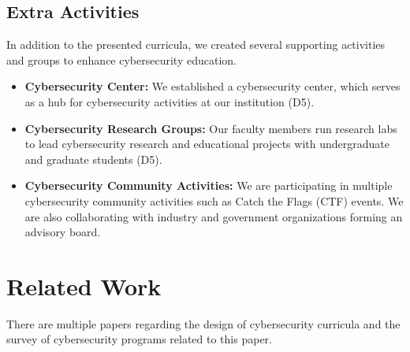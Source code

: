 \documentclass{article}
\begin{document}
\subsection{Extra Activities}

In addition to the presented curricula, we created several supporting activities and groups to enhance cybersecurity education.

\begin{itemize}

\item \textbf{Cybersecurity Center:} We established a cybersecurity center, which serves as a hub for cybersecurity activities at our institution (D5).

\item \textbf{Cybersecurity Research Groups:} Our faculty members run research labs to lead cybersecurity research and educational projects with undergraduate and graduate students (D5).

\item \textbf{Cybersecurity Community Activities:} We are participating in multiple cybersecurity community activities such as Catch the Flags (CTF) events. We are also collaborating with  industry and government organizations forming an advisory board.

\end{itemize}


\section{Related Work}
\label{sec:relatedwork}

There are multiple papers regarding the design of cybersecurity curricula and the survey of cybersecurity programs related to this paper.
\end{document}
